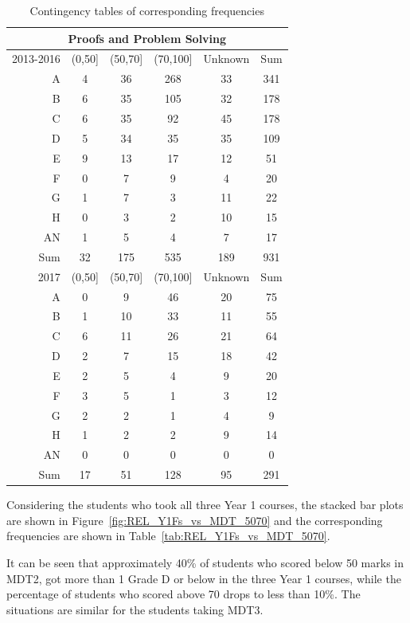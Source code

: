 \documentclass[a4paper]{report}
\begin{document}
\begin{table}[ht]
  \centering
  \begin{tabular}{r|cccc|c}
    \hline
    \multicolumn{6}{c}{\textbf{Proofs and Problem Solving}} \\
    \hline
  2013-2016 & (0,50] & (50,70] & (70,100] & Unknown & Sum \\ 
    \hline
  A & 4 & 36 & 268 & 33 & 341 \\ 
    B & 6 & 35 & 105 & 32 & 178 \\ 
    C & 6 & 35 & 92 & 45 & 178 \\ 
    D & 5 & 34 & 35 & 35 & 109 \\ 
    E & 9 & 13 & 17 & 12 & 51 \\ 
    F & 0 & 7 & 9 & 4 & 20 \\ 
    G & 1 & 7 & 3 & 11 & 22 \\ 
    H & 0 & 3 & 2 & 10 & 15 \\ 
    AN & 1 & 5 & 4 & 7 & 17 \\ 
    \hline
    Sum & 32 & 175 & 535 & 189 & 931 \\ 
    \hline
     \hline
    2017 & (0,50] & (50,70] & (70,100] & Unknown & Sum \\ 
    \hline
    A & 0 & 9 & 46 & 20 & 75 \\ 
      B & 1 & 10 & 33 & 11 & 55 \\ 
      C & 6 & 11 & 26 & 21 & 64 \\ 
      D & 2 & 7 & 15 & 18 & 42 \\ 
      E & 2 & 5 & 4 & 9 & 20 \\ 
      F & 3 & 5 & 1 & 3 & 12 \\ 
      G & 2 & 2 & 1 & 4 & 9 \\ 
      H & 1 & 2 & 2 & 9 & 14 \\ 
      AN & 0 & 0 & 0 & 0 & 0 \\ 
    \hline
      Sum & 17 & 51 & 128 & 95 & 291 \\ 
       \hline
  \end{tabular}
  \caption{\label{tab:REL_PPSGrade_vs_MDT}Contingency tables of corresponding frequencies}
\end{table}

Considering the students who took all three Year 1 courses, the stacked bar plots are shown in Figure~\ref{fig:REL_Y1Fs_vs_MDT_5070} and the corresponding frequencies are shown in Table~\ref{tab:REL_Y1Fs_vs_MDT_5070}. 

It can be seen that approximately 40\% of students who scored below 50 marks in MDT2, got more than 1 Grade D or below in the three Year 1 courses, while the percentage of students who scored above 70 drops to less than 10\%. The situations are similar for the students taking MDT3. 
\end{document}
